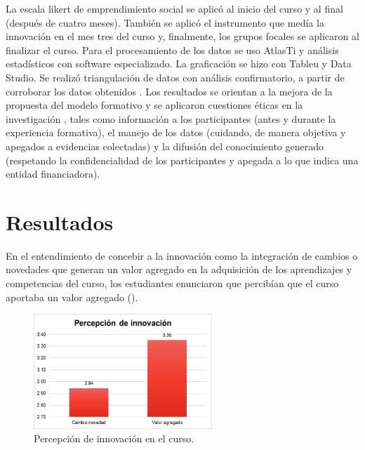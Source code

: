 \documentclass[spanish]{textolivre}
\begin{document}
La escala likert de emprendimiento social se aplicó al inicio del curso y al final (después de cuatro meses). También se aplicó el instrumento que medía la innovación en el mes tres del curso y, finalmente, los grupos focales se aplicaron al finalizar el curso. Para el procesamiento de los datos se uso AtlasTi y análisis estadísticos con software especializado. La graficación se hizo con Tableu y Data Studio. Se realizó triangulación de datos con análisis confirmatorio, a partir de corroborar los datos obtenidos \cite{leech2007}. Los resultados se orientan a la mejora de la propuesta del modelo formativo  y se aplicaron cuestiones éticas en la investigación \cite{creswell2007, smith1990, traxler2012}, tales como información a los participantes (antes y durante la experiencia formativa), el manejo de los datos (cuidando, de manera objetiva y apegados a evidencias colectadas) y la difusión del conocimiento generado (respetando la confidencialidad de los participantes y apegada a lo que indica una entidad financiadora).

\section{Resultados}
En el entendimiento de concebir a la innovación como la integración de cambios o novedades que generan un valor agregado en la adquisición de los aprendizajes y competencias del curso, los estudiantes enunciaron que percibían que el curso aportaba un valor agregado ().

\begin{figure}[htbp]
 \centering
 \includegraphics[width=0.6\textwidth]{fig2-25716.png}
 \caption{Percepción de innovación en el curso.}
 \label{fig2}
\end{figure}
\end{document}

